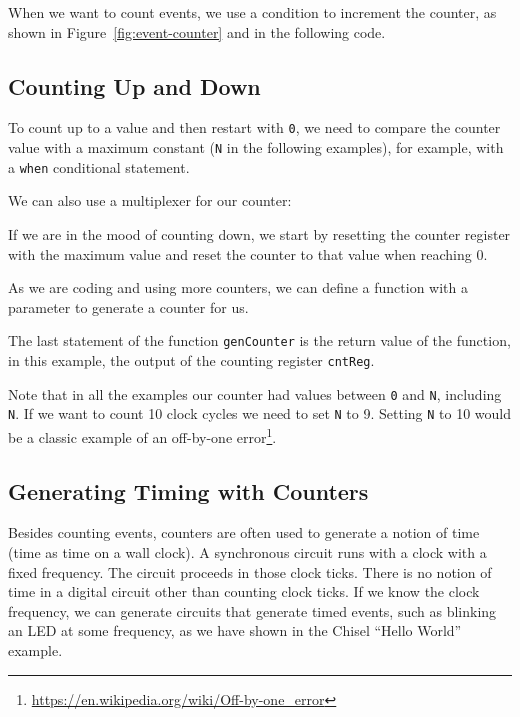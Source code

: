 \documentclass[%
    10pt,
    headinclude, footexclude,
    openright, %
    notitlepage,
    cleardoubleempty,
    headsepline,
    pointlessnumbers,
    bibtotoc, idxtotoc,
    ]{scrbook}
\newcommand{\code}[1]{{\small{\texttt{#1}}}}
\newcommand{\myref}[2]{\href{#1}{#2}}
\renewcommand{\myref}[2]{{#2}{\footnote{\url{#1}}}}
\begin{document}
\noindent When we want to count events, we use a condition to increment the counter,
as shown in Figure~\ref{fig:event-counter} and in the following code.


\subsection{Counting Up and Down}

To count up to a value and then restart with \code{0}, we need to compare
the counter value with a maximum constant (\code{N} in the following examples),
for example, with a \code{when} conditional statement.


\noindent We can also use a multiplexer for our counter:


\noindent If we are in the mood of counting down, we start by resetting the counter register
with the maximum value and reset the counter to that value when reaching 0.


\noindent As we are coding and using more counters, we can
define a function with a parameter to generate a counter for us.


\noindent The last statement of the function \code{genCounter} is the return
value of the function, in this example, the output of
the counting register \code{cntReg}.

Note that in all the examples our counter had values between \code{0} and
\code{N}, including \code{N}. If we want to count 10 clock cycles we need
to set \code{N} to 9. Setting \code{N} to 10 would be a classic example of an
\myref{https://en.wikipedia.org/wiki/Off-by-one_error}{off-by-one error}.

\subsection{Generating Timing with Counters}
\label{sec:gen:timing}


Besides counting events, counters are often used to generate a notion of time
(time as time on a wall clock).
A synchronous circuit runs with a clock with a fixed frequency.
The circuit proceeds in those clock ticks. There is no notion of time in a digital
circuit other than counting clock ticks. If we know the clock frequency, we
can generate circuits that generate timed events, such as blinking an LED
at some frequency, as we have shown in the Chisel ``Hello World'' example.
\end{document}
